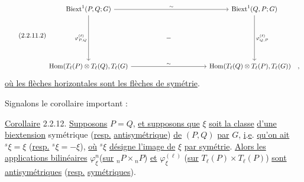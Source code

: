 \begin{equation}\tag{2.2.11.2}
\begin{tikzcd}[row sep=large, column sep=huge]
\mathrm{Biext}^1(P,Q;G) \arrow[rr, "\sim"] \arrow[dd, "{\varphi^{(\ell)}_{P,Q}}"'] & & \mathrm{Biext}^1(Q,P;G) \arrow[dd, "{\varphi^{(\ell)}_{Q,P}}"] \\
& - & \\
\mathrm{Hom}(T_\ell(P)\otimes T_\ell(Q),T_\ell(G) \arrow[rr, "\sim"] & & \mathrm{Hom}(T_\ell(Q)\otimes T_\ell(P),T_\ell(G)) \quad ,
\end{tikzcd}
\end{equation}
\underline{où les flèches horizontales sont les flèches de symétrie}.

Signalons le corollaire important :

\underline{Corollaire} 2.2.12. \underline{Supposons} $P=Q$, \underline{et supposons que} $\xi$ \underline{soit la classe} \underline{d'une biextension} symétrique (\underline{resp.} \underline{antisymétrique}) \underline{de} $(P,Q)$ \underline{par} $G$, \underline{i}.\underline{e}. \underline{qu'on ait} ${}^s\xi = \xi$ (\underline{resp.} ${}^s\xi = -\xi$), \underline{où} ${}^s\xi$ \underline{désigne l'image de} $\xi$ \underline{par symétrie}. \underline{Alors les applications bilinéaires} $\varphi^n_\xi$(\underline{sur} ${}_nP\times{}_nP$) \underline{et} $\varphi^{(\ell)}_\xi$ (\underline{sur} $T_\ell(P)\times T_\ell(P)$) \underline{sont antisymétriques} (\underline{resp.} \underline{symétriques}).


